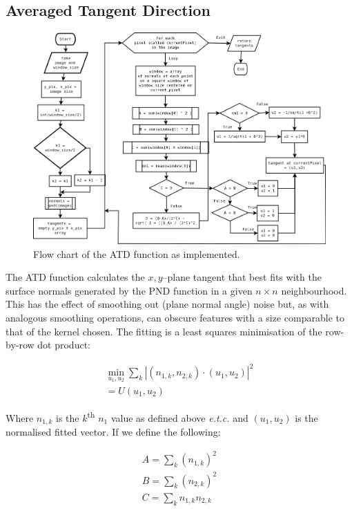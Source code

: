 \documentclass[11pt,a4paper]{article}
\begin{document}
\begin{multicols}{2}
	\subsection{Averaged Tangent Direction}
        \begin{figure}
        \centering
        \includegraphics[width = \textwidth]{ATD.png}
        \caption{Flow chart of the ATD function as implemented.}
        \label{fig:ATD-alg}
      \end{figure}
		The ATD function calculates the $x,y$--plane tangent that best fits with the surface normals generated by the PND function in a given $n \times n$ neighbourhood. This has the effect of smoothing out (plane normal angle) noise but, as with analogous smoothing operations, can obscure features with a size comparable to that of the kernel chosen. The fitting is a least squares minimisation of the row-by-row dot product:

		\begin{equation}
		\begin{split}
			\min_{u_1, u_2} \sum_k |(n_{1,k}, n_{2,k}) \cdot (u_1, u_2)|^2 \\
			= U(u_1, u_2)
		\end{split}
		\end{equation}

		Where $n_{1,k}$ is the $k$\textsuperscript{th} $n_1$ value as defined above \textit{e.t.c.} and $(u_1, u_2)$ is the normalised fitted vector. If we define the following:

		\begin{equation}
		\begin{split}
			A = \sum_k (n_{1,k})^2 \\
			B = \sum_k (n_{2,k})^2 \\
			C = \sum_k n_{1,k} n_{2,k}
		\end{split}
		\end{equation}


\end{multicols}
\end{document}
